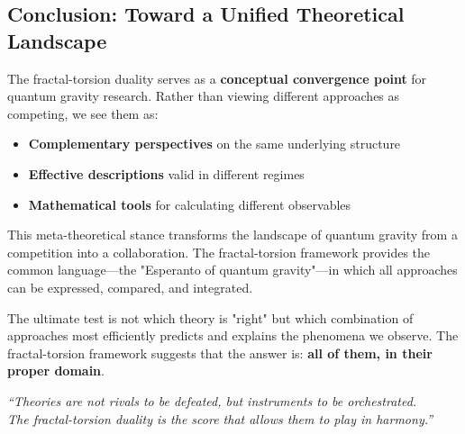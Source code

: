 \subsection{Conclusion: Toward a Unified Theoretical Landscape}

The fractal-torsion duality serves as a \textbf{conceptual convergence point} for quantum gravity research. Rather than viewing different approaches as competing, we see them as:

\begin{itemize}
    \item \textbf{Complementary perspectives} on the same underlying structure
    \item \textbf{Effective descriptions} valid in different regimes
    \item \textbf{Mathematical tools} for calculating different observables
\end{itemize}

This meta-theoretical stance transforms the landscape of quantum gravity from a competition into a collaboration. The fractal-torsion framework provides the common language—the "Esperanto of quantum gravity"—in which all approaches can be expressed, compared, and integrated.

The ultimate test is not which theory is "right" but which combination of approaches most efficiently predicts and explains the phenomena we observe. The fractal-torsion framework suggests that the answer is: \textbf{all of them, in their proper domain}.

\begin{flushright}
\textit{``Theories are not rivals to be defeated, but instruments to be orchestrated.\\
The fractal-torsion duality is the score that allows them to play in harmony.''}
\end{flushright}
